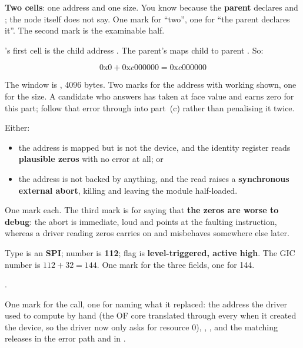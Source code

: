 \textbf{Two cells}: one address and one size. You know because the \textbf{parent} declares
 and ; the node itself does not say. One mark
for ``two'', one for ``the parent declares it''. The second mark is the examinable half.

's first cell is the child address . The parent's  maps child  to parent . So:

\[
  0\text{x}0 + 0\text{x}c000000 = 0\text{x}c000000
\]

\noindent The window is , 4096 bytes. Two marks for the address with working shown, one
for the size. A candidate who answers  has taken  at face value and earns zero
for this part; follow that error through into part~(c) rather than penalising it twice.

Either:
\begin{itemize}
  \item the address is mapped but is not the device, and the identity register reads
    \textbf{plausible zeros} with no error at all; or
  \item the address is not backed by anything, and the read raises a \textbf{synchronous external
    abort}, killing  and leaving the module half-loaded.
\end{itemize}
One mark each. The third mark is for saying that \textbf{the zeros are worse to debug}: the abort is
immediate, loud and points at the faulting instruction, whereas a driver reading zeros carries on
and misbehaves somewhere else later.

Type  is an \textbf{SPI}; number  is \textbf{112}; flag  is
\textbf{level-triggered, active high}. The GIC number is $112 + 32 = 144$. One mark for the three
fields, one for 144.

.

One mark for the call, one for naming what it replaced: the address the driver used to compute by
hand (the OF core translated  through every  when it created the device, so
the driver now only asks for resource 0), , , and the
matching releases in the error path and in .


